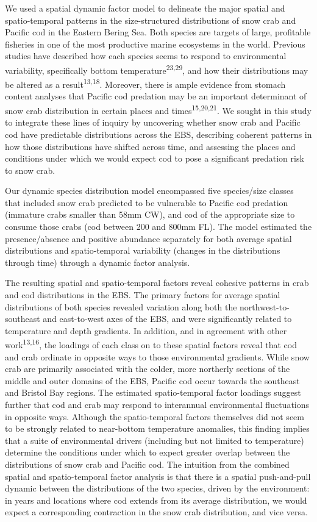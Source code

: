 \documentclass[11pt,]{article}
\begin{document}
We used a spatial dynamic factor model to delineate the major spatial and spatio-temporal patterns in the size-structured distributions of snow crab and Pacific cod in the Eastern Bering Sea. Both species are targets of large, profitable fisheries in one of the most productive marine ecosystems in the world. Previous studies have described how each species seems to respond to environmental variability, specifically bottom temperature\textsuperscript{23,29}, and how their distributions may be altered as a result\textsuperscript{13,18}. Moreover, there is ample evidence from stomach content analyses that Pacific cod predation may be an important determinant of snow crab distribution in certain places and times\textsuperscript{15,20,21}. We sought in this study to integrate these lines of inquiry by uncovering whether snow crab and Pacific cod have predictable distributions across the EBS, describing coherent patterns in how those distributions have shifted across time, and assessing the places and conditions under which we would expect cod to pose a significant predation risk to snow crab.

Our dynamic species distribution model encompassed five species/size classes that included snow crab predicted to be vulnerable to Pacific cod predation (immature crabs smaller than 58mm CW), and cod of the appropriate size to consume those crabs (cod between 200 and 800mm FL). The model estimated the presence/absence and positive abundance separately for both average spatial distributions and spatio-temporal variability (changes in the distributions through time) through a dynamic factor analysis.

The resulting spatial and spatio-temporal factors reveal cohesive patterns in crab and cod distributions in the EBS. The primary factors for average spatial distributions of both species revealed variation along both the northwest-to-southeast and east-to-west axes of the EBS, and were significantly related to temperature and depth gradients. In addition, and in agreement with other work\textsuperscript{13,16}, the loadings of each class on to these spatial factors reveal that cod and crab ordinate in opposite ways to those environmental gradients. While snow crab are primarily associated with the colder, more northerly sections of the middle and outer domains of the EBS, Pacific cod occur towards the southeast and Bristol Bay regions. The estimated spatio-temporal factor loadings suggest further that cod and crab may respond to interannual environmental fluctuations in opposite ways. Although the spatio-temporal factors themselves did not seem to be strongly related to near-bottom temperature anomalies, this finding implies that a suite of environmental drivers (including but not limited to temperature) determine the conditions under which to expect greater overlap between the distributions of snow crab and Pacific cod. The intuition from the combined spatial and spatio-temporal factor analysis is that there is a spatial push-and-pull dynamic between the distributions of the two species, driven by the environment: in years and locations where cod extends from its average distribution, we would expect a corresponding contraction in the snow crab distribution, and vice versa.
\end{document}
